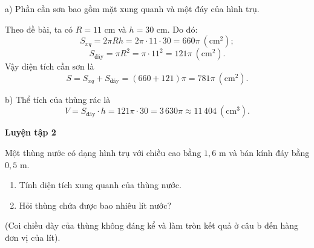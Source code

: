     a) Phần cần sơn bao gồm mặt xung quanh và một đáy của hình trụ.

    Theo đề bài, ta có $R=11$ cm và $h=30$ cm. Do đó:
    \[
        S_{xq}=2\pi Rh=2\pi\cdot11\cdot30=660\pi\ (\text{cm}^2);
    \]
    \[
        S_{\text{đáy}}=\pi R^2=\pi\cdot11^2=121\pi\ (\text{cm}^2).
    \]
    Vậy diện tích cần sơn là
    \[
        S=S_{xq}+S_{\text{đáy}}=(660+121)\pi=781\pi\ (\text{cm}^2).
    \]

    b) Thể tích của thùng rác là
    \[
        V=S_{\text{đáy}}\cdot h=121\pi\cdot30=3\,630\pi\approx11\,404\ (\text{cm}^3).
    \]

    \textbf{Luyện tập 2}

    Một thùng nước có dạng hình trụ với chiều cao bằng $1{,}6$ m và bán kính đáy bằng $0{,}5$ m.
    \begin{enumerate}[label=\alph*)]
        \item Tính diện tích xung quanh của thùng nước.
        \item Hỏi thùng chứa được bao nhiêu lít nước?
    \end{enumerate}
    (Coi chiều dày của thùng không đáng kể và làm tròn kết quả ở câu b đến hàng đơn vị của lít).

    \answerline
    \answerline

